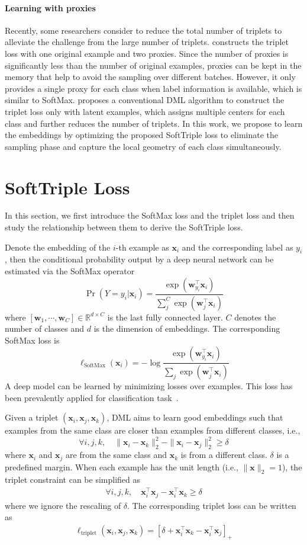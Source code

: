 \documentclass[10pt,twocolumn,letterpaper]{article}
\def \R {\mathbb{R}}
\def \x {\mathbf{x}}
\def \w {\mathbf{w}}
\begin{document}
\paragraph{Learning with proxies}
Recently, some researchers consider to reduce the total number of triplets to alleviate the challenge from the large number of triplets. \cite{Attias17} constructs the triplet loss with one original example and two proxies. Since the number of proxies is significantly less than the number of original examples, proxies can be kept in the memory that help to avoid the sampling over different batches. However, it only provides a single proxy for each class when label information is available, which is similar to SoftMax. \cite{QianTLZJ18} proposes a conventional DML algorithm to construct the triplet loss only with latent examples, which assigns multiple centers for each class and further reduces the number of triplets. In this work, we propose to learn the embeddings by optimizing the proposed SoftTriple loss to eliminate the sampling phase and capture the local geometry of each class simultaneously.

\section{SoftTriple Loss}
\label{sec:method}
In this section, we first introduce the SoftMax loss and the triplet loss and then study the relationship between them to derive the SoftTriple loss. 

Denote the embedding of the $i$-th example as $\x_i$ and the corresponding label as $y_i$, then the conditional probability output by a deep neural network can be estimated via the SoftMax operator
\[\Pr(Y=y_i|\x_i) = \frac{\exp(\w_{y_i}^\top \x_i)}{\sum_j^C \exp(\w_j^\top \x_i)}\]
where $[\w_1,\cdots,\w_C]\in\R^{d\times C}$ is the last fully connected layer. $C$ denotes the number of classes and $d$ is the dimension of embeddings.
The corresponding SoftMax loss is
\[\ell_{\mathrm{SoftMax}}(\x_i) = -\log\frac{\exp(\w_{y_i}^\top \x_i)}{\sum_j \exp(\w_j^\top \x_i)}\]
A deep model can be learned by minimizing losses over examples. This loss has been prevalently applied for classification task~\cite{KrizhevskySH12}.

Given a triplet $(\x_i, \x_j, \x_k)$, DML aims to learn good embeddings such that examples from the same class are closer than examples from different classes, i.e.,
\[\forall i,j,k,\quad \|\x_i- \x_k\|_2^2 - \|\x_i- \x_j\|_2^2 \geq \delta\]
where $\x_i$ and $\x_j$ are from the same class and $\x_k$ is from a different class. $\delta$ is a predefined margin. When each example has the unit length (i.e., $\|\x\|_2=1$), the triplet constraint can be simplified as
\begin{eqnarray}\label{eq:const}
\forall i,j,k, \quad \x_i^\top \x_j - \x_i^\top \x_k \geq \delta
\end{eqnarray}
where we ignore the rescaling of $\delta$.
The corresponding triplet loss can be written as
\begin{eqnarray}\label{eq:trih}
\ell_{\mathrm{triplet}}(\x_i,\x_j,\x_k) = [\delta+ \x_i^{\top} \x_k - \x_i^{\top} \x_j ]_+
\end{eqnarray}
\end{document}
